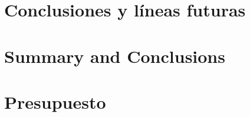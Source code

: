 \documentclass[spanish,a4paper,12pt,oneside]{extreport}
\begin{document}


\newpage{\pagestyle{empty}}
\thispagestyle{empty}

\chapter{\LARGE Conclusiones y líneas futuras}
\label{chapter:Resultados}



\newpage{\pagestyle{empty}}
\thispagestyle{empty}

\chapter{\LARGE Summary and Conclusions}
\label{chapter:Conclusiones}



\newpage{\pagestyle{empty}}
\thispagestyle{empty}

\chapter{\LARGE Presupuesto}
\label{chapter:presupuesto}





% 

% 

\end{document}
